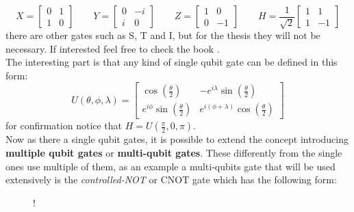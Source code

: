 \begin{equation*}
	X = \begin{bmatrix}
		0 & 1 \\
		1 & 0 
	\end{bmatrix}\qquad
	Y = \begin{bmatrix}
		0 & -i \\
		i & 0
	\end{bmatrix}\qquad
	Z = \begin{bmatrix}
		1 & 0 \\
		0 & -1 
	\end{bmatrix}\qquad
	H = \frac{1}{\sqrt{2}}\begin{bmatrix}
		1 & 1 \\
		1 & -1
	\end{bmatrix}
\end{equation*}
there are other gates such as S, T and I, but for the thesis they will not be necessary.
If interested feel free to check the book \cite{nielsen_chuang_2010}.\\
The interesting part is that any kind of single qubit gate can be defined in this form:
\begin{equation}\label{generic gate}
	U(\theta,  \phi, \lambda) =  \begin{bmatrix}
		\cos(\frac{\theta}{2}) & -e^{i\lambda} \sin(\frac{\theta}{2})\\
		e^{i\phi}\sin(\frac{\theta}{2}) & e^{i(\phi+ \lambda)}\cos(\frac{\theta}{2})
	\end{bmatrix}
\end{equation}
for confirmation notice that $H = U(\frac{\pi}{2}, 0, \pi)$.\\
Now as there a single qubit gates, it is possible to extend the concept introducing \textbf{multiple qubit gates} or \textbf{multi-qubit gates}. These differently from the single ones use multiple of them, as an example a multi-qubits gate that will be used extensively is the \textit{controlled-NOT} or CNOT gate which has the following form:\\
\begin{figure}[H]
	\centering
	\resizebox {0.5\linewidth} {!} {
	}
	\label{cnot}
\end{figure}
